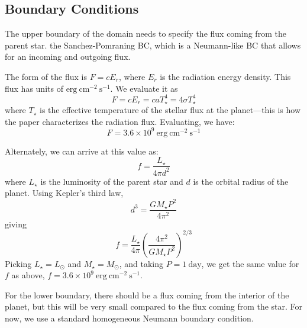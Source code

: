 \documentclass[11pt]{article}
\begin{document}
\subsection{Boundary Conditions}

The upper boundary of the domain needs to specify the flux coming from
the parent star.  the Sanchez-Pomraning BC, which is
a Neumann-like BC that allows for an incoming and outgoing flux.

The form of the flux is $F = cE_r$, where $E_r$ is the radiation
energy density.  This flux has units of $\mathrm{erg~cm^{-2}~s^{-1}}$.
We evaluate it as
\begin{equation}
  F = cE_r = c a T_\star^4 = 4\sigma T_\star^4
\end{equation}
where $T_\star$ is the effective temperature of the stellar flux at
the planet---this is how the paper characterizes the radiation
flux.  Evaluating, we have:
\begin{equation}
  F = 3.6\times 10^9~\mathrm{erg~cm^{-2}~s^{-1}}
\end{equation}

Alternately, we can arrive at this value as:
\begin{equation}
  f = \frac{L_\star}{4\pi d^2}
\end{equation}
where $L_\star$ is the luminosity of the parent star and $d$ is the
orbital radius of the planet.  Using Kepler's third law,
\begin{equation}
  d^3 = \frac{GM_\star P^2}{4\pi^2}
\end{equation}
giving
\begin{equation}
  f = \frac{L_\star}{4\pi} \left ( \frac{4 \pi^2}{GM_\star P^2} \right )^{2/3}
\end{equation}
Picking $L_\star = L_\odot$ and $M_\star = M_\odot$, and taking $P =
1~\mathrm{day}$, we get the same value for $f$ as above, $f =
3.6\times 10^9~\mathrm{erg~cm^{-2}~s^{-1}}$.

For the lower boundary, there should be a flux coming from the
interior of the planet, but this will be very small compared to the
flux coming from the star.  For now, we use a standard homogeneous
Neumann boundary condition.
\end{document}
